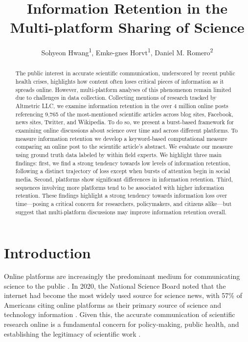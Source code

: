 \documentclass[letterpaper]{article} %
\title{Information Retention in the Multi-platform Sharing of Science}
\author {
Sohyeon Hwang\textsuperscript{\rm 1},
Emke-gnes Horvt\textsuperscript{\rm 1},
Daniel M. Romero\textsuperscript{\rm 2} \\
}
\begin{document}
\maketitle

\begin{abstract}
The public interest in accurate scientific communication, underscored by recent public health crises, highlights how content often loses critical pieces of information as it spreads online. However, multi-platform analyses of this phenomenon remain limited due to challenges in data collection. Collecting mentions of research tracked by Altmetric LLC, we examine information retention in the over 4 million online posts referencing 9,765 of the most-mentioned scientific articles across blog sites, Facebook, news sites, Twitter, and Wikipedia. To do so, we present a burst-based framework for examining online discussions about science over time and across different platforms. To measure information retention we develop a keyword-based computational measure comparing an online post to the scientific article's abstract. We evaluate our measure using ground truth data labeled by within field experts. We highlight three main findings: first, we find a strong tendency towards low levels of information retention, following a distinct trajectory of loss except when bursts of attention begin in social media. Second, platforms show significant differences in information retention. Third, sequences involving more platforms tend to be associated with higher information retention. These findings highlight a strong tendency towards information loss over time---posing a critical concern for researchers, policymakers, and citizens alike---but suggest that multi-platform discussions may improve information retention overall.
\end{abstract}

\section{Introduction}
Online platforms are increasingly the predominant medium for communicating science to the public \citep{suScienceNewsConsumption2015}. In 2020, the National Science Board noted that the internet had become the most widely used source for science news, with 57\% of Americans citing online platforms as their primary source of science and technology information %
\citep{nationalscienceboardScienceTechnologyPublic2020}. Given this, the accurate communication of scientific research online is a fundamental concern for policy-making, public health, and establishing the legitimacy of scientific work \cite{jamiesonSignalingTrustworthinessScience2019}.
\end{document}
